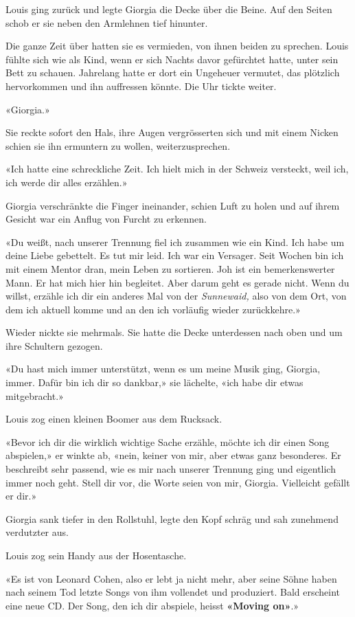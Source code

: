 Louis ging zurück und legte Giorgia die Decke über die Beine. Auf den
Seiten schob er sie neben den Armlehnen tief hinunter.

Die ganze Zeit über hatten sie es vermieden, von ihnen beiden zu
sprechen. Louis fühlte sich wie als Kind, wenn er sich Nachts davor
gefürchtet hatte, unter sein Bett zu schauen. Jahrelang hatte er dort
ein Ungeheuer vermutet, das plötzlich hervorkommen und ihn auffressen
könnte. Die Uhr tickte weiter.

«Giorgia.»

Sie reckte sofort den Hals, ihre Augen vergrösserten sich und mit einem
Nicken schien sie ihn ermuntern zu wollen, weiterzusprechen.

«Ich hatte eine schreckliche Zeit. Ich hielt mich in der Schweiz
versteckt, weil ich, ich werde dir alles erzählen.»

Giorgia verschränkte die Finger ineinander, schien Luft zu holen und auf
ihrem Gesicht war ein Anflug von Furcht zu erkennen.

«Du weißt, nach unserer Trennung fiel ich zusammen wie ein Kind. Ich
habe um deine Liebe gebettelt. Es tut mir leid. Ich war ein Versager.
Seit Wochen bin ich mit einem Mentor dran, mein Leben zu sortieren. Joh
ist ein bemerkenswerter Mann. Er hat mich hier hin begleitet. Aber darum
geht es gerade nicht. Wenn du willst, erzähle ich dir ein anderes Mal
von der \emph{Sunnewaid,} also von dem Ort, von dem ich aktuell komme
und an den ich vorläufig wieder zurückkehre.»

Wieder nickte sie mehrmals. Sie hatte die Decke unterdessen nach oben
und um ihre Schultern gezogen.

«Du hast mich immer unterstützt, wenn es um meine Musik ging, Giorgia,
immer. Dafür bin ich dir so dankbar,» sie lächelte, «ich habe dir etwas
mitgebracht.»

Louis zog einen kleinen Boomer aus dem Rucksack.

«Bevor ich dir die wirklich wichtige Sache erzähle, möchte ich dir einen
Song abspielen,» er winkte ab, «nein, keiner von mir, aber etwas ganz
besonderes. Er beschreibt sehr passend, wie es mir nach unserer Trennung
ging und eigentlich immer noch geht. Stell dir vor, die Worte seien von
mir, Giorgia. Vielleicht gefällt er dir.»

Giorgia sank tiefer in den Rollstuhl, legte den Kopf schräg und sah
zunehmend verdutzter aus.

Louis zog sein Handy aus der Hosentasche.

«Es ist von Leonard Cohen, also er lebt ja nicht mehr, aber seine Söhne
haben nach seinem Tod letzte Songs von ihm vollendet und produziert.
Bald erscheint eine neue CD. Der Song, den ich dir abspiele, heisst
\textbf{«Moving on»}.»

